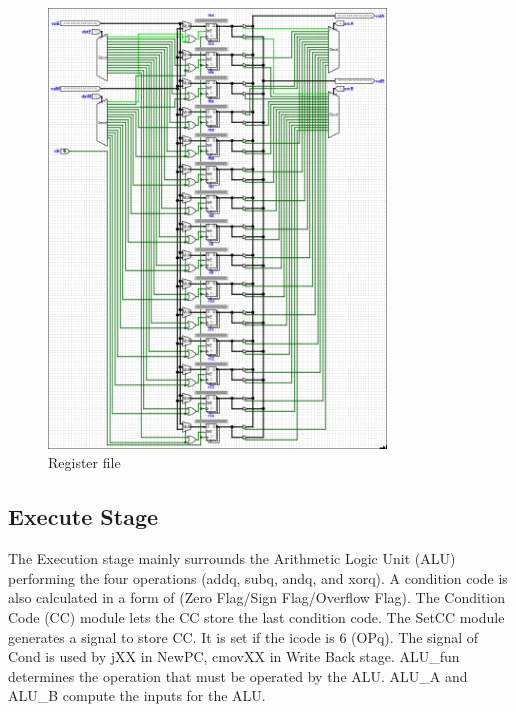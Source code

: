 \documentclass{article}
\begin{document}
\begin{figure}[H]
    \centering
    \includegraphics[width=0.8\textwidth]{./images/register_file.png}
    \caption{Register file}
\end{figure}

\subsection{Execute Stage}

The Execution stage mainly surrounds the Arithmetic Logic Unit (ALU) performing the four operations (addq, subq, andq, and xorq). 
A condition code is also calculated in a form of (Zero Flag/Sign Flag/Overflow Flag). 
The Condition Code (CC) module lets the CC store the last condition code. 
The SetCC module generates a signal to store CC. It is set if the icode is 6 (OPq). 
The signal of Cond is used by jXX in NewPC, cmovXX in Write Back stage. 
ALU\_fun determines the operation that must be operated by the ALU. 
ALU\_A and ALU\_B compute the inputs for the ALU. 
\end{document}
